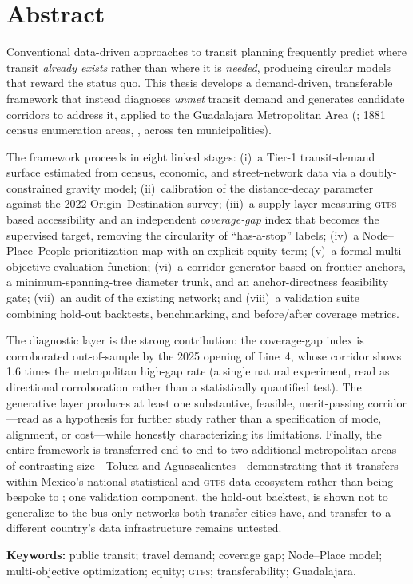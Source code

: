 \chapter*{Abstract}

Conventional data-driven approaches to transit planning frequently predict where
transit \emph{already exists} rather than where it is \emph{needed}, producing
circular models that reward the status quo. This thesis develops a demand-driven,
transferable framework that instead diagnoses \emph{unmet} transit demand and
generates candidate corridors to address it, applied to the Guadalajara
Metropolitan Area (\zmg; \num{1881} census enumeration areas, \ageb, across ten
municipalities).

The framework proceeds in eight linked stages: (i)~a Tier-1 transit-demand surface
estimated from census, economic, and street-network data via a doubly-constrained
gravity model; (ii)~calibration of the distance-decay parameter against the 2022
Origin--Destination survey; (iii)~a supply layer measuring \textsc{gtfs}-based
accessibility and an independent \emph{coverage-gap} index that becomes the
supervised target, removing the circularity of ``has-a-stop'' labels; (iv)~a
Node--Place--People prioritization map with an explicit equity term; (v)~a formal
multi-objective evaluation function; (vi)~a corridor generator based on frontier
anchors, a minimum-spanning-tree diameter trunk, and an anchor-directness
feasibility gate; (vii)~an audit of the existing network; and (viii)~a validation
suite combining hold-out backtests, benchmarking, and before/after coverage
metrics.

The diagnostic layer is the strong contribution: the coverage-gap index is
corroborated out-of-sample by the 2025 opening of \zmg Line~4, whose corridor shows
\num{1.6} times the metropolitan high-gap rate (a single natural experiment, read as
directional corroboration rather than a statistically quantified test). The
generative layer produces at least one substantive, feasible, merit-passing
corridor---read as a hypothesis for further study rather than a specification of
mode, alignment, or cost---while honestly characterizing its limitations. Finally,
the entire framework is transferred end-to-end to two additional metropolitan areas
of contrasting size---Toluca and Aguascalientes---demonstrating that it transfers
within Mexico's national statistical and \textsc{gtfs} data ecosystem rather than
being bespoke to \zmg; one validation component, the hold-out backtest, is shown not
to generalize to the bus-only networks both transfer cities have, and transfer to a
different country's data infrastructure remains untested.

\vspace{1em}
\noindent\textbf{Keywords:} public transit; travel demand; coverage gap; Node--Place
model; multi-objective optimization; equity; \textsc{gtfs}; transferability;
Guadalajara.

\clearpage
